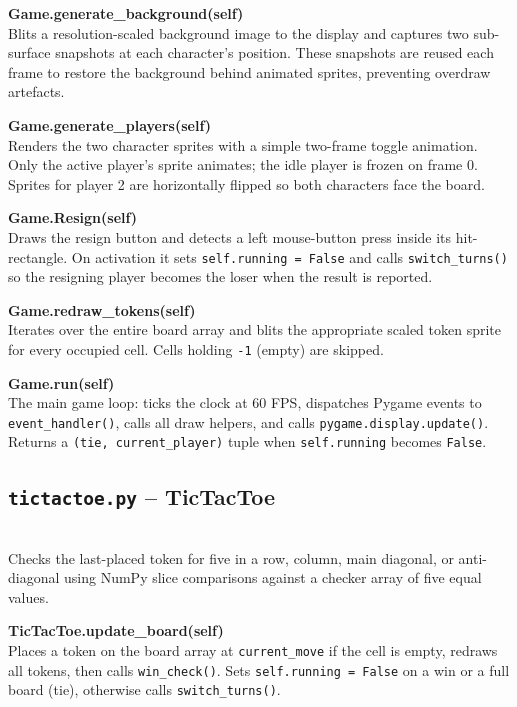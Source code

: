 \documentclass[12pt, a4paper]{article}
\newcommand{\bftt}[1]{{\normalfont\bfseries\ttfamily #1}}
\begin{document}
\medskip
\bftt{Game.generate\_background(self)}\\
Blits a resolution-scaled background image to the display and captures two sub-surface snapshots at each character's position. These snapshots are reused each frame to restore the background behind animated sprites, preventing overdraw artefacts.

\medskip
\bftt{Game.generate\_players(self)}\\
Renders the two character sprites with a simple two-frame toggle animation. Only the active player's sprite animates; the idle player is frozen on frame 0. Sprites for player 2 are horizontally flipped so both characters face the board.

\medskip
\bftt{Game.Resign(self)}\\
Draws the resign button and detects a left mouse-button press inside its hit-rectangle. On activation it sets \texttt{self.running = False} and calls \texttt{switch\_turns()} so the resigning player becomes the loser when the result is reported.

\medskip
\bftt{Game.redraw\_tokens(self)}\\
Iterates over the entire board array \cite{numpy} and blits the appropriate scaled token sprite for every occupied cell. Cells holding \texttt{-1} (empty) are skipped.

\medskip
\bftt{Game.run(self)}\\
The main game loop: ticks the clock at 60 FPS, dispatches Pygame events to \texttt{event\_handler()}, calls all draw helpers, and calls \texttt{pygame.display.update()}. Returns a \texttt{(tie, current\_player)} tuple when \texttt{self.running} becomes \texttt{False}.

\subsection{\texttt{tictactoe.py} -- TicTacToe}
\label{subsec:tictactoe}

\noindent\bftt{TicTacToe.win\_check(self)}\\
Checks the last-placed token for five in a row, column, main diagonal, or anti-diagonal using NumPy \cite{numpy} slice comparisons against a checker array of five equal values.

\medskip
\bftt{TicTacToe.update\_board(self)}\\
Places a token on the board array at \texttt{current\_move} if the cell is empty, redraws all tokens, then calls \texttt{win\_check()}. Sets \texttt{self.running = False} on a win or a full board (tie), otherwise calls \texttt{switch\_turns()}.
\end{document}
